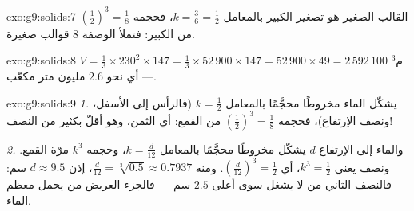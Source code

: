 \begin{solution}{exo:g9:solids:7}
القالب الصغير هو تصغير الكبير بالمعامل $k = \frac36 =
\frac12$، فحجمه $\left(\frac12\right)^3 = \frac18$ من
 الكبير: فتملأ الوصفة $8$ قوالب صغيرة.
\end{solution}

\begin{solution}{exo:g9:solids:8}
$V = \frac13 \times 230^2 \times 147 = \frac13 \times 52\,900 \times 147
= 52\,900 \times 49 = 2\,592\,100$ م$^3$ --- أي نحو $2.6$ مليون متر
مكعّب.
\end{solution}

\begin{solution}{exo:g9:solids:9}
\emph{1.} يشكّل الماء مخروطًا محجَّمًا بالمعامل $k = \frac12$
(فالرأس إلى الأسفل، ونصف الاِرتفاع)، فحجمه $\left(\frac12\right)^3 = \frac18$
من  القمع: أي الثمن، وهو أقلّ بكثير من النصف!

\emph{2.} والماء إلى الاِرتفاع $d$ يشكّل مخروطًا محجَّمًا بالمعامل
$k = \frac{d}{12}$، وحجمه $k^3$ مرّة  القمع. ونصف 
يعني $k^3 = \frac12$، أي
$\left(\frac{d}{12}\right)^3 = \frac12$. ومنه
$\frac{d}{12} = \sqrt[3]{0.5} \approx 0.7937$، إذن
$d \approx 9.5$ سم: فالنصف الثاني من  لا يشغل سوى أعلى
$2.5$ سم --- فالجزء العريض من  يحمل معظم الماء.
\end{solution}

